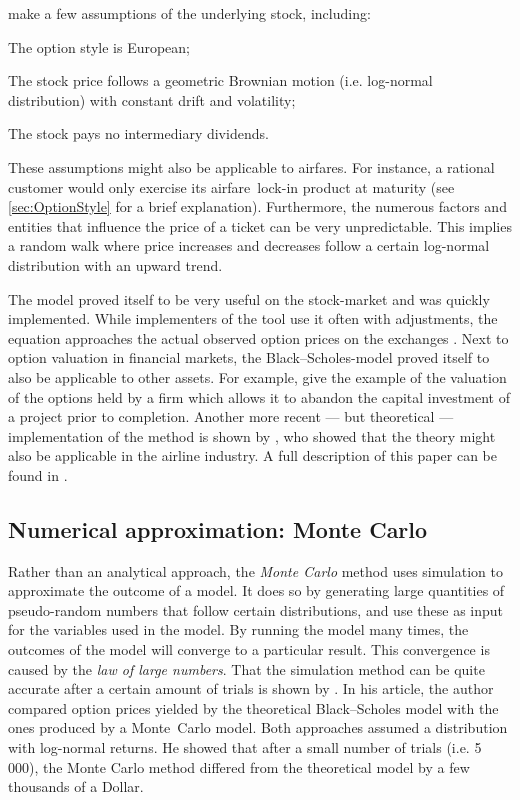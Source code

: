\noindent
{} make a few assumptions of the underlying stock, including:
\begin{compactitem}
\item The option style is European;
\item The stock price follows a geometric Brownian motion (i.e. log-normal distribution) with constant drift and volatility;
\item The stock pays no intermediary dividends.
\end{compactitem}

\noindent
These assumptions might also be applicable to airfares. For instance, a rational customer would only exercise its airfare~lock-in product at maturity (see \autoref{sec:OptionStyle} for a brief explanation). Furthermore, the numerous factors and entities that influence the price of a ticket can be very unpredictable. This implies a random walk where price increases and decreases follow a certain log-normal distribution with an upward trend.

The model proved itself to be very useful on the stock-market and was quickly implemented. While implementers of the tool use it often with adjustments, the equation approaches the actual observed option prices on the exchanges \cite{bodie2008investments}.
Next to option valuation in financial markets, the Black--Scholes-model proved itself to also be applicable to other assets. For example,  give the example of the valuation of the options held by a firm which allows it to abandon the capital investment of a project prior to completion. Another more recent --- but theoretical --- implementation of the method is shown by , who showed that the theory might also be applicable in the airline industry. A full description of this paper can be found in .


\subsection{Numerical approximation: Monte Carlo}
Rather than an analytical approach, the \emph{Monte Carlo} method uses simulation to approximate the outcome of a model. It does so by generating large quantities of pseudo-random numbers that follow certain distributions, and use these as input for the variables used in the model.  By running the model many times, the outcomes of the model will converge to a particular result. This convergence is caused by the \emph{law of large numbers}. That the simulation method can be quite accurate after a certain amount of trials is shown by . In his article, the author compared option prices yielded by the theoretical Black--Scholes model with the ones produced by a Monte~Carlo model. Both approaches assumed a distribution with log-normal returns. He showed that after a small number of trials (i.e. 5\,000), the Monte Carlo method differed from the theoretical model by a few thousands of a Dollar.

